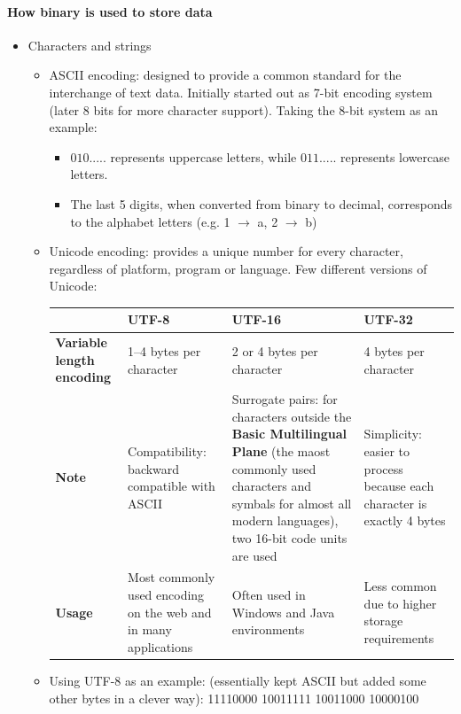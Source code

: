 \paragraph{How binary is used to store data}
\begin{itemize}
    \item Characters and strings
    \begin{itemize}
        \item ASCII encoding: designed to provide a common standard for the interchange of text data. Initially started out as 7-bit encoding system (later 8 bits for more character support). Taking the 8-bit system as an example:
\begin{itemize}
    \item $010.....$ represents uppercase letters, while $011.....$ represents lowercase letters.
    \item The last 5 digits, when converted from binary to decimal, corresponds to the alphabet letters (e.g. 1 $\rightarrow$ a, 2 $\rightarrow$ b)
\end{itemize}
	\item Unicode encoding: provides a unique number for every character, regardless of platform, program or language. Few different versions of Unicode:
	\begin{center}
		\renewcommand{\arraystretch}{1.5}
\begin{tabular}{|p{2cm}|p{4cm}|p{5.5cm}|p{4cm}|}
\hline
& \textbf{UTF-8} & \textbf{UTF-16} & \textbf{UTF-32} \\
\hline
\textbf{Variable length encoding} & 1--4 bytes per character & 2 or 4 bytes per character & 4 bytes per character \\
\hline
\textbf{Note} & Compatibility: backward compatible with ASCII & Surrogate pairs: for characters outside the \textbf{Basic Multilingual Plane} (the 
maost commonly used characters and symbals for almost all modern 
languages), two 16-bit code units are used & Simplicity: easier to process because each character is exactly 4 bytes \\
\hline
\textbf{Usage} & Most commonly used encoding on the web and in many applications & Often used in Windows and Java environments & Less common due to higher storage requirements \\
\hline
\end{tabular}
	\end{center}
\item Using UTF-8 as an example: (essentially kept ASCII but added some other bytes in a clever way): 11110000 10011111 10011000 10000100

\end{itemize}
\end{itemize}
